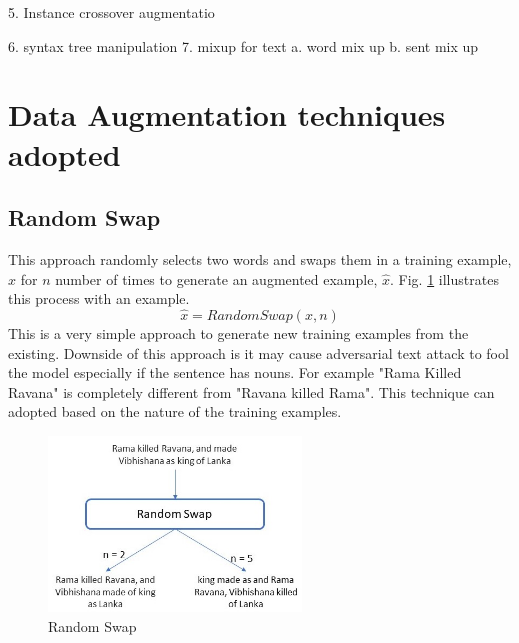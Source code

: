 \documentclass{article}
\begin{document}
5. Instance crossover augmentatio

6. syntax tree manipulation
7. mixup for text
a. word mix up
b. sent mix up

\section{Data Augmentation techniques adopted}
\subsection{Random Swap}
This approach randomly selects two words and swaps them in a training example, $x$ for $n$ number of times to generate an augmented example, $\hat{x}$. Fig. \ref{fig:randomswap} illustrates this process with an example. 
\begin{equation}
\hat{x} = RandomSwap(x, n)
\end{equation}
This is a very simple approach to generate new training examples from the existing. Downside of this approach is it may cause adversarial text attack to fool the model especially if the sentence has nouns. For example "Rama Killed Ravana" is completely different from "Ravana killed Rama". This technique can adopted based on the nature of the training examples.
\begin{figure}[h!]
\centering
  \includegraphics[width=0.6\textwidth]{randomswap.jpg}
  \caption{Random Swap}
  \label{fig:randomswap}
\end{figure}
\end{document}
